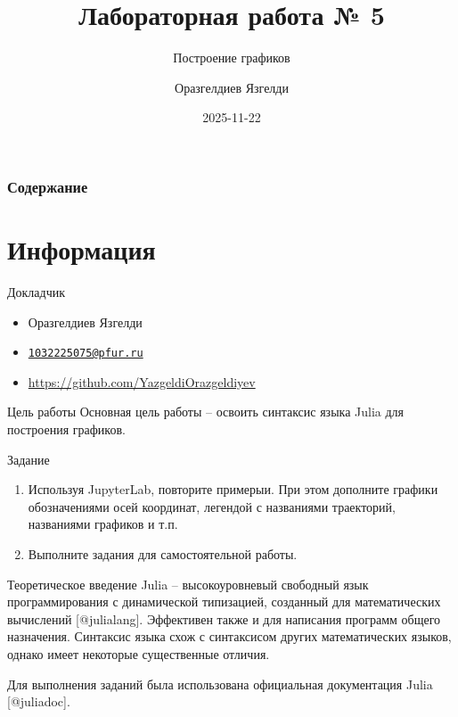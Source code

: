 \documentclass[
  ignorenonframetext,
  aspectratio=169,
]{beamer}
\title{Лабораторная работа № 5}
\subtitle{Построение графиков}
\author{Оразгелдиев Язгелди}
\date{2025-11-22}
\providecommand{\tightlist}{%
  \setlength{\itemsep}{0pt}\setlength{\parskip}{0pt}}\usepackage{longtable,booktabs,array}
\renewcommand*\contentsname{Содержание}
\newcommand\contentsname{Содержание}
\begin{document}
\frame{\titlepage}
\ifdefined\Shaded\renewenvironment{Shaded}{\begin{tcolorbox}[interior hidden, frame hidden, boxrule=0pt, sharp corners, borderline west={3pt}{0pt}{shadecolor}, enhanced, breakable]}{\end{tcolorbox}}\fi

\renewcommand*\contentsname{Содержание}
\begin{frame}[allowframebreaks]
  \frametitle{Содержание}
  \tableofcontents[hideallsubsections]
\end{frame}
\hypertarget{ux438ux43dux444ux43eux440ux43cux430ux446ux438ux44f}{%
\section{Информация}\label{ux438ux43dux444ux43eux440ux43cux430ux446ux438ux44f}}

\begin{frame}{Докладчик}
\protect\hypertarget{ux434ux43eux43aux43bux430ux434ux447ux438ux43a}{}
\begin{itemize}[<+->]
\tightlist
\item
  Оразгелдиев Язгелди
\item
  \href{mailto:1032225075@pfur.ru}{\nolinkurl{1032225075@pfur.ru}}
\item
  \url{https://github.com/YazgeldiOrazgeldiyev}
\end{itemize}
\end{frame}

\begin{frame}{Цель работы}
\protect\hypertarget{ux446ux435ux43bux44c-ux440ux430ux431ux43eux442ux44b}{}
Основная цель работы -- освоить синтаксис языка Julia для построения
графиков.
\end{frame}

\begin{frame}{Задание}
\protect\hypertarget{ux437ux430ux434ux430ux43dux438ux435}{}
\begin{enumerate}[<+->]
\item
  Используя JupyterLab, повторите примерыи. При этом дополните графики
  обозначениями осей координат, легендой с названиями траекторий,
  названиями графиков и т.п.
\item
  Выполните задания для самостоятельной работы.
\end{enumerate}
\end{frame}

\begin{frame}{Теоретическое введение}
\protect\hypertarget{ux442ux435ux43eux440ux435ux442ux438ux447ux435ux441ux43aux43eux435-ux432ux432ux435ux434ux435ux43dux438ux435}{}
Julia -- высокоуровневый свободный язык программирования с динамической
типизацией, созданный для математических вычислений {[}@julialang{]}.
Эффективен также и для написания программ общего назначения. Синтаксис
языка схож с синтаксисом других математических языков, однако имеет
некоторые существенные отличия.

Для выполнения заданий была использована официальная документация Julia
{[}@juliadoc{]}.
\end{frame}
\end{document}
